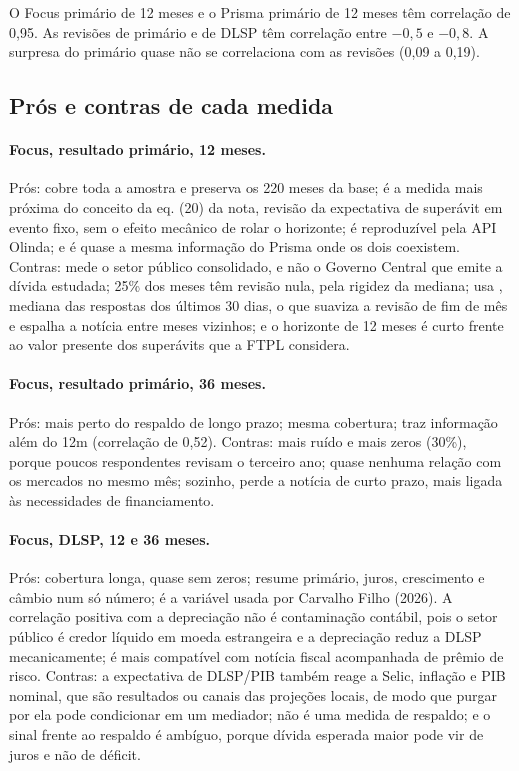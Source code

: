 \documentclass[12pt,a4paper]{article}
\begin{document}
O Focus primário de 12 meses e o Prisma primário de 12 meses têm correlação de 0,95.
As revisões de primário e de DLSP têm correlação entre \(-0{,}5\) e \(-0{,}8\). A
surpresa do primário quase não se correlaciona com as revisões (0,09 a 0,19).

\subsection{Prós e contras de cada medida}

\paragraph{Focus, resultado primário, 12 meses.}
Prós: cobre toda a amostra e preserva os 220 meses da base; é a medida mais próxima
do conceito da eq. (20) da nota, revisão da expectativa de superávit em evento fixo,
sem o efeito mecânico de rolar o horizonte; é reproduzível pela API Olinda; e é quase
a mesma informação do Prisma onde os dois coexistem. Contras: mede o setor público
consolidado, e não o Governo Central que emite a dívida estudada; 25\% dos meses têm
revisão nula, pela rigidez da mediana; usa , mediana das
respostas dos últimos 30 dias, o que suaviza a revisão de fim de mês e espalha a
notícia entre meses vizinhos; e o horizonte de 12 meses é curto frente ao valor
presente dos superávits que a FTPL considera.

\paragraph{Focus, resultado primário, 36 meses.}
Prós: mais perto do respaldo de longo prazo; mesma cobertura; traz informação além do
12m (correlação de 0,52). Contras: mais ruído e mais zeros (30\%), porque poucos
respondentes revisam o terceiro ano; quase nenhuma relação com os mercados no mesmo
mês; sozinho, perde a notícia de curto prazo, mais ligada às necessidades de
financiamento.

\paragraph{Focus, DLSP, 12 e 36 meses.}
Prós: cobertura longa, quase sem zeros; resume primário, juros, crescimento e câmbio
num só número; é a variável usada por Carvalho Filho (2026). A correlação positiva com
a depreciação não é contaminação contábil, pois o setor público é credor líquido em
moeda estrangeira e a depreciação reduz a DLSP mecanicamente; é mais compatível com
notícia fiscal acompanhada de prêmio de risco. Contras: a expectativa de DLSP/PIB
também reage a Selic, inflação e PIB nominal, que são resultados ou canais das
projeções locais, de modo que purgar por ela pode condicionar em um mediador; não é
uma medida de respaldo; e o sinal frente ao respaldo é ambíguo, porque dívida
esperada maior pode vir de juros e não de déficit.
\end{document}
